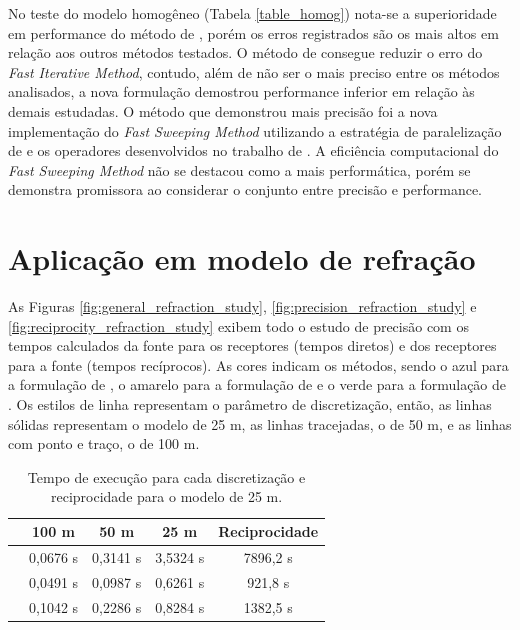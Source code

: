 No teste do modelo homogêneo (Tabela \ref{table_homog}) nota-se a superioridade em performance do método de , porém os erros registrados são os mais altos em relação aos outros métodos testados. O método de  consegue reduzir o erro do \textit{Fast Iterative Method}, contudo, além de não ser o mais preciso entre os métodos analisados, a nova formulação demostrou performance inferior em relação às demais estudadas. O método que demonstrou mais precisão foi a nova implementação do \textit{Fast Sweeping Method} utilizando a estratégia de paralelização de  e os operadores desenvolvidos no trabalho de . A eficiência computacional do \textit{Fast Sweeping Method} não se destacou como a mais performática, porém se demonstra promissora ao considerar o conjunto entre precisão e performance.  

\section{Aplicação em modelo de refração}

As Figuras \ref{fig:general_refraction_study}, \ref{fig:precision_refraction_study} e \ref{fig:reciprocity_refraction_study} exibem todo o estudo de precisão com os tempos calculados da fonte para os receptores (tempos diretos) e dos receptores para a fonte (tempos recíprocos). As cores indicam os métodos, sendo o azul para a formulação de , o amarelo para a formulação de  e o verde para a formulação de . Os estilos de linha representam o parâmetro de discretização, então, as linhas sólidas representam o modelo de 25 m, as linhas tracejadas, o de 50 m, e as linhas com ponto e traço, o de 100 m. 

\begin{table}[H]
	\caption{Tempo de execução para cada discretização e reciprocidade para o modelo de 25 m.}
	\begin{tabular}{r|cccc}
		& 100 m    & 50 m     & 25 m     & Reciprocidade \\ \hline
		\citeonline{podvin1991finite}   & 0,0676 s & 0,3141 s & 3,5324 s & 7896,2 s        \\ \hline
		\citeonline{jeong2008fast} & 0,0491 s & 0,0987 s & 0,6261 s & 921,8 s              \\ \hline
		\citeonline{noble2014accurate} & 0,1042 s & 0,2286 s & 0,8284 s & 1382,5 s          \\
	\end{tabular}
	\label{table_refModel}
\end{table}

